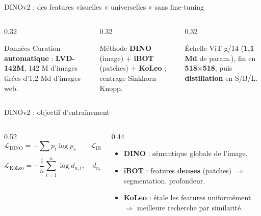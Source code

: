 \documentclass[aspectratio=169,10pt]{beamer}
\newcommand{\src}[1]{\par\vfill\hfill{\tiny\color{grisE}#1}}
\begin{document}
\begin{frame}{DINOv2 : des features visuelles « universelles » sans fine-tuning}
  \begin{columns}[T]
    \begin{column}{0.32\textwidth}
      \begin{exampleblock}{ Données}
        \footnotesize Curation \textbf{automatique} : \textbf{LVD-142M}, 142 M d'images tirées d'1,2 Md d'images web.
      \end{exampleblock}
    \end{column}
    \begin{column}{0.32\textwidth}
      \begin{block}{ Méthode}
        \footnotesize \textbf{DINO} (image) + \textbf{iBOT} (patches) + \textbf{KoLeo} ; centrage Sinkhorn-Knopp.
      \end{block}
    \end{column}
    \begin{column}{0.32\textwidth}
      \begin{alertblock}{ Échelle}
        \footnotesize ViT-g/14 (\textbf{1,1 Md} de param.), fin en \textbf{518$\times$518}, puis \textbf{distillation} en S/B/L.
      \end{alertblock}
    \end{column}
  \end{columns}
  \vspace{2mm}
  \centering
  \resizebox{0.8\linewidth}{!}{}
  \src{\citet{oquab2024dinov2}}
\end{frame}

\begin{frame}{DINOv2 : objectif d'entraînement}
  \centering
  \resizebox{0.8\linewidth}{!}{}
  \begin{columns}[T]
    \begin{column}{0.52\textwidth}
      \footnotesize
      \[ \mathcal{L}_{\text{DINO}} = -\sum p_t \log p_s \qquad \mathcal{L}_{\text{iBOT}} = -\sum_{i\in\mathcal{M}} p_{t,i} \log p_{s,i} \]
      \[ \mathcal{L}_{\text{KoLeo}} = -\frac{1}{n}\sum_{i=1}^{n}\log d_{n,i},\quad d_{n,i} = \min_{j\neq i}\|x_i - x_j\| \]
    \end{column}
    \begin{column}{0.44\textwidth}
      \begin{itemize}\footnotesize
        \item \textbf{DINO} : sémantique globale de l'image.
        \item \textbf{iBOT} : features \textbf{denses} (patches) $\Rightarrow$ segmentation, profondeur.
        \item \textbf{KoLeo} : étale les features uniformément $\Rightarrow$ meilleure recherche par similarité.
      \end{itemize}
    \end{column}
  \end{columns}
  \src{\citet{oquab2024dinov2,zhou2022ibot,sablayrolles2019koleo}}
\end{frame}
\end{document}
